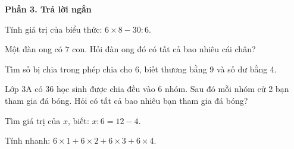 \textbf{Phần 3. Trả lời ngắn}

\begin{ex} %
Tính giá trị của biểu thức: $6 \times 8 - 30 : 6$.
\end{ex}

\begin{ex} %
Một đàn ong có $7$ con. Hỏi đàn ong đó có tất cả bao nhiêu cái chân?
\end{ex}

\begin{ex} %
Tìm số bị chia trong phép chia cho 6, biết thương bằng 9 và số dư bằng 4.
\end{ex}

\begin{ex} %
Lớp 3A có 36 học sinh được chia đều vào 6 nhóm. Sau đó mỗi nhóm cử 2 bạn tham gia đá bóng. Hỏi có tất cả bao nhiêu bạn tham gia đá bóng?
\end{ex}

\begin{ex} %
Tìm giá trị của $x$, biết: $x : 6 = 12 - 4$.
\end{ex}

\begin{ex} %
Tính nhanh: $6 \times 1 + 6 \times 2 + 6 \times 3 + 6 \times 4$.
\end{ex}
